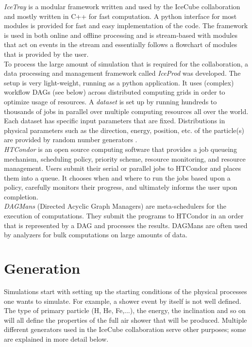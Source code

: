\begin{corollary}
\textit{IceTray}  is a modular framework written and used by the IceCube collaboration and mostly written in C++ for fast computation. A python interface for most modules is provided for fast and easy implementation of the code. The framework is used in both online and offline processing and is stream-based with modules that act on events in the stream and essentially follows a flowchart of modules that is provided by the user.\\

\noindent To process the large amount of simulation that is required for the collaboration, a data processing and management framework called \textit{IceProd} was developed. The setup is very light-weight, running as a python application. It uses (complex) workflow DAGs (see below) across distributed computing grids in order to optimize usage of resources. A \textit{dataset} is set up by running hundreds to thousands of jobs in parallel over multiple computing resources all over the world. Each dataset has specific input parameters that are fixed. Distributions in physical parameters such as the direction, energy, position, etc. of the particle(s) are provided by random number generators \cite{1742-6596-664-6-062056}.\\

\noindent \textit{HTCondor} is an open source computing software that provides a job queueing mechanism, scheduling policy, priority scheme, resource monitoring, and resource management. Users submit their serial or parallel jobs to HTCondor and places them into a queue. It chooses when and where to run the jobs based upon a policy, carefully monitors their progress, and ultimately informs the user upon completion.\\

\noindent \textit{DAGMans} (Directed Acyclic Graph Managers) are meta-schedulers for the execution of computations. They submit the programs to HTCondor in an order that is represented by a DAG and processes the results. DAGMans are often used by analyzers for bulk computations on large amounts of data.
\end{corollary}

\section{Generation}
Simulations start with setting up the starting conditions of the physical processes one wants to simulate. For example, a shower event by itself is not well defined. The type of primary particle (H, He, Fe,...), the energy, the inclination and so on will all define the properties of the full air shower that will be produced. Multiple different generators used in the IceCube collaboration serve other purposes; some are explained in more detail below.

